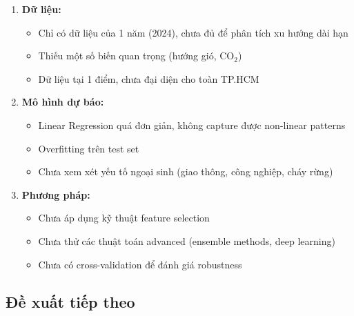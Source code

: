 \documentclass[12pt,a4paper]{article}
\newcommand{\cotwo}{CO$_2$}
\begin{document}
\begin{enumerate}
    \item \textbf{Dữ liệu:}
    \begin{itemize}
        \item Chỉ có dữ liệu của 1 năm (2024), chưa đủ để phân tích xu hướng dài hạn
        \item Thiếu một số biến quan trọng (hướng gió, \cotwo{})
        \item Dữ liệu tại 1 điểm, chưa đại diện cho toàn TP.HCM
    \end{itemize}
    
    \item \textbf{Mô hình dự báo:}
    \begin{itemize}
        \item Linear Regression quá đơn giản, không capture được non-linear patterns
        \item Overfitting trên test set
        \item Chưa xem xét yếu tố ngoại sinh (giao thông, công nghiệp, cháy rừng)
    \end{itemize}
    
    \item \textbf{Phương pháp:}
    \begin{itemize}
        \item Chưa áp dụng kỹ thuật feature selection
        \item Chưa thử các thuật toán advanced (ensemble methods, deep learning)
        \item Chưa có cross-validation để đánh giá robustness
    \end{itemize}
\end{enumerate}

\subsection{Đề xuất tiếp theo}
\end{document}
